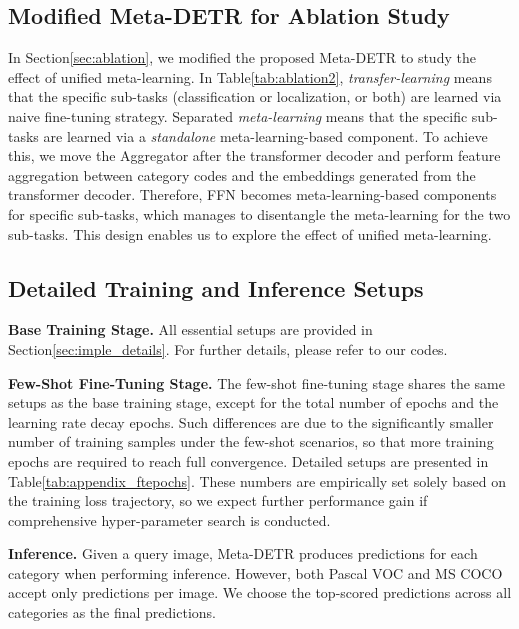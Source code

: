 \documentclass[10pt,twocolumn,letterpaper]{article}
\begin{document}
\subsection{Modified Meta-DETR for Ablation Study}

In Section\;\ref{sec:ablation}, we modified the proposed Meta-DETR to study the effect of unified meta-learning. In Table\;\ref{tab:ablation2}, \textit{transfer-learning} means that the specific sub-tasks (classification or localization, or both) are learned via naive fine-tuning strategy. Separated \textit{meta-learning} means that the specific sub-tasks are learned via a \textit{standalone} meta-learning-based component. To achieve this, we move the Aggregator after the transformer decoder and perform feature aggregation between category codes and the embeddings generated from the transformer decoder. Therefore, FFN becomes meta-learning-based components for specific sub-tasks, which manages to disentangle the meta-learning for the two sub-tasks. This design enables us to explore the effect of unified meta-learning.



\subsection{Detailed Training and Inference Setups}

\noindent
\textbf{Base Training Stage.}
All essential setups are provided in Section\;\ref{sec:imple_details}. For further details, please refer to our codes.

\smallskip
\noindent
\textbf{Few-Shot Fine-Tuning Stage.}
The few-shot fine-tuning stage shares the same setups as the base training stage, except for the total number of epochs and the learning rate decay epochs. Such differences are due to the significantly smaller number of training samples under the few-shot scenarios, so that more training epochs are required to reach full convergence. Detailed setups are presented in Table\;\ref{tab:appendix_ftepochs}. These numbers are empirically set solely based on the training loss trajectory, so we expect further performance gain if comprehensive hyper-parameter search is conducted.

\smallskip
\noindent
\textbf{Inference.}
Given a query image, Meta-DETR produces  predictions for each category when performing inference. However, both Pascal VOC and MS COCO accept only  predictions per image. We choose the top-scored  predictions across all categories as the final predictions.
\end{document}
